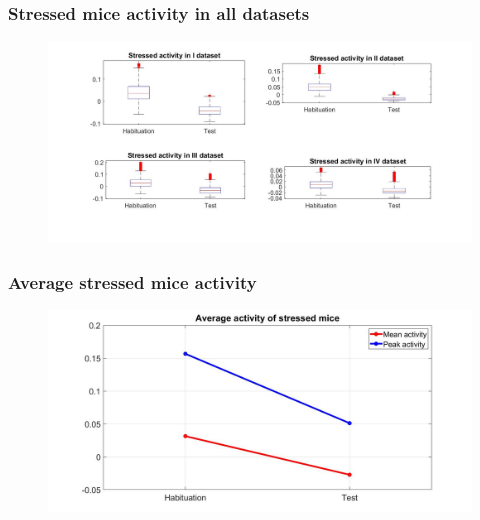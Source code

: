 \documentclass{beamer}
\begin{document}
\begin{frame}
\frametitle{ Stressed mice activity in all datasets}



\begin{figure}[H]
	\begin{center}
		\hspace*{-2.1 cm}
		\includegraphics[scale=.33]{stressed_boxplot.jpg} 
	\end{center}  
	
	
\end{figure}

\end{frame}

\begin{frame}
\frametitle{ Average stressed mice activity}



\begin{figure}[H]
	\begin{center}
		\hspace*{-1.3cm}
		\includegraphics[scale=.30]{stressed_avg.jpg} 
	\end{center}  
	
	
\end{figure}

\end{frame}
\end{document}
